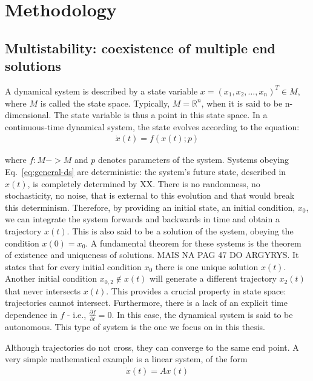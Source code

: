 \chapter{Methodology}

\section[Multistability]{Multistability: coexistence of multiple end solutions}

A dynamical system is described by a state variable $x = (x_1, x_2, \ldots, x_n)^T \in M$, where $M$ is called the state space. Typically, $M = \mathbb{R}^n$, when it is said to be n-dimensional. The state variable is thus a point in this state space. In a continuous-time dynamical system, the state evolves according to the equation:
%
\begin{align}\label{eq:general-ds}
    \dot{x}(t) = f(x(t); p)
\end{align}

where $f : M->M$ and $p$ denotes parameters of the system.  Systems obeying Eq.~\ref{eq:general-ds} are deterministic: the system's future state, described in $x(t)$, is completely determined by XX. There is no randomness, no stochasticity, no noise, that is external to this evolution and that would break this determinism. Therefore, by providing an initial state, an initial condition, $x_0$, we can integrate the system forwards and backwards in time and obtain a trajectory $x(t)$. This is also said to be a solution of the system, obeying the condition $x(0) = x_0$.  A fundamental theorem for these systems is the theorem of existence and uniqueness of solutions. MAIS NA PAG 47 DO ARGYRYS. It states that for every initial condition $x_0$ there is one unique solution $x(t)$. Another initial condition $x_{0,2} \notin x(t)$ will generate a different trajectory $x_2(t)$ that never intersects $x(t)$. This provides a crucial property in state space: trajectories cannot intersect.  
Furthermore, there is a lack of an explicit time dependence in $f$ - i.e., $\frac{\partial f}{\partial t} = 0$. In this case, the dynamical system is said to be autonomous. This type of system is the one we focus on in this thesis. 

Although trajectories do not cross, they can converge to the same end point. A very simple mathematical example is a linear system, of the form 
\begin{align}
    \dot{x}(t) = A x(t)
\end{align}

